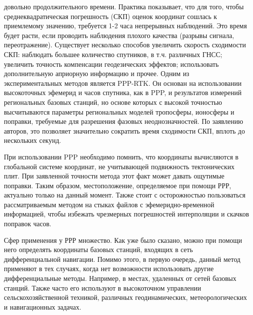 \documentclass[a4paper,12pt]{report}
\begin{document}
довольно продолжительного времени. Практика показывает, что для того, чтобы среднеквадратическая погрешность (СКП) оценок координат сошлась к 
приемлемому значению, требуется 1-2 часа непрерывных наблюдений. Это время будет расти, если проводить наблюдения плохого качества (разрывы 
сигнала, переотражение). Существует несколько способов увеличить скорость сходимости СКП: наблюдать большее количество спутников, в т.ч. 
различных ГНСС; увеличить точность компенсации геодезических эффектов; использовать дополнительную априорную информацию и прочее. Одним из 
экспериментальных методов является PPP-RTK. Он основан на использовании высокоточных эфемерид и часов спутника, как в PPP, и результатов 
измерений региональных базовых станций, но основе которых с высокой точностью высчитываются параметры региональных моделей тропосферы, 
ионосферы и поправки, требуемые для разрешения фазовых неоднозначностей. По заявлению авторов, это позволяет значительно сократить время
сходимости СКП, вплоть до нескольких секунд. \cite{ppp-rtk} \par
При использовании PPP необходимо помнить, что координаты вычисляются в глобальной системе координат, не учитывающей подвижность тектонических 
плит. При заявленной точности метода этот факт может давать ощутимые поправки. Таким образом, местоположение, определяемое при помощи РРР, 
актуально только на данный момент. Также стоит с осторожностью пользоваться рассматриваемым методом на стыках файлов с эфемеридно-временной 
информацией, чтобы избежать чрезмерных погрешностей интерполяции и скачков поправок часов. \par
Сфер применения у РРР множество. Как уже было сказано, можно при помощи него определять координаты базовых станций, входящих в сеть 
дифференциальной навигации. Помимо этого, в первую очередь, данный метод применяют в тех случаях, когда нет возможности использовать другие 
дифференциальные методы. Например, в местах, удаленных от сетей базовых станций. Также часто его используют в высокоточном управлении 
сельскохозяйственной техникой, различных геодинамических, метеорологических и навигационных задачах. 
\end{document}
